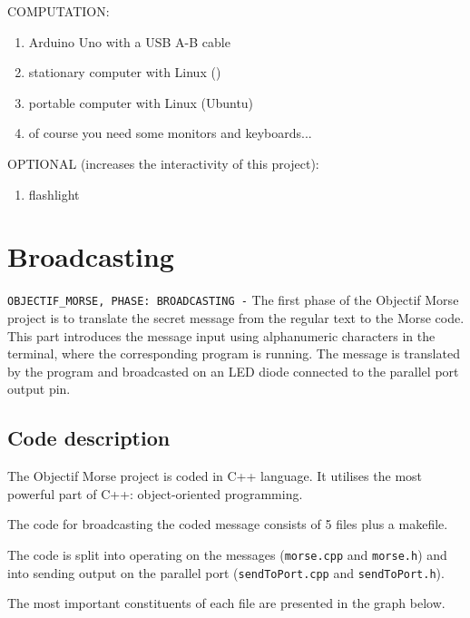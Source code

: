 \documentclass[12pt]{report}
\begin{document}
COMPUTATION:

\begin{enumerate}

\item Arduino Uno with a USB A-B cable
\item stationary computer with Linux ()
\item portable computer with Linux (Ubuntu)
\item of course you need some monitors and keyboards...

\end{enumerate}

OPTIONAL (increases the interactivity of this project):

\begin{enumerate}

\item flashlight

\end{enumerate}





\newpage

\chapter{Broadcasting}

\verb|OBJECTIF_MORSE, PHASE: BROADCASTING -| The first phase of the Objectif Morse project is to translate the secret message from the regular text to the Morse code. This part introduces the message input using alphanumeric characters in the terminal, where the corresponding program is running. The message is translated by the program and broadcasted on an LED diode connected to the parallel port output pin.

\section{Code description}

The Objectif Morse project is coded in C++ language. It utilises the most powerful part of C++: object-oriented programming.

The code for broadcasting the coded message consists of 5 files plus a makefile. 

The code is split into operating on the messages (\verb|morse.cpp| and \verb|morse.h|) and into sending output on the parallel port (\verb|sendToPort.cpp| and \verb|sendToPort.h|).

The most important constituents of each file are presented in the graph below.
\end{document}
